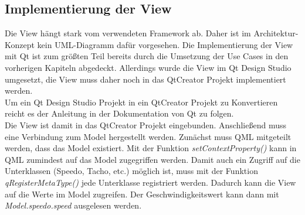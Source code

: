 \subsection{Implementierung der View}
Die View hängt stark vom verwendeten Framework ab. Daher ist im Architektur-Konzept kein UML-Diagramm dafür vorgesehen. Die Implementierung der View mit Qt ist zum größten Teil bereits durch die Umsetzung der Use Cases in den vorherigen Kapiteln abgedeckt. Allerdings wurde die View im Qt Design Studio umgesetzt, die View muss daher noch in das QtCreator Projekt implementiert werden.\\

Um ein Qt Design Studio Projekt in ein QtCreator Projekt zu Konvertieren reicht es der Anleitung in der Dokumentation von Qt zu folgen.\\

Die View ist damit in das QtCreator Projekt eingebunden. Anschließend muss eine Verbindung zum Model hergestellt werden. Zunächst muss QML mitgeteilt werden, dass das Model existiert. Mit der Funktion \textit{setContextProperty()} kann in QML zumindest auf das Model zugegriffen werden. Damit auch ein Zugriff auf die Unterklassen (Speedo, Tacho, etc.) möglich ist, muss mit der Funktion \textit{qRegisterMetaType()} jede Unterklasse registriert werden. Dadurch kann die View auf die Werte im Model zugreifen. Der Geschwindigkeitswert kann dann mit \textit{Model.speedo.speed} ausgelesen werden.\\